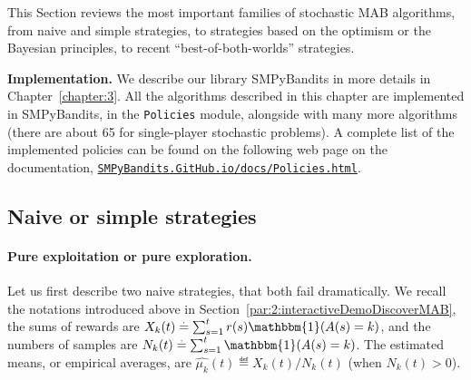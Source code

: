This Section reviews the most important families of stochastic MAB algorithms, from naive and simple strategies, to strategies based on the optimism or the Bayesian principles, to recent ``best-of-both-worlds'' strategies.


\textbf{Implementation.}
%
We describe our library SMPyBandits in more details in Chapter~\ref{chapter:3}.
All the algorithms described in this chapter are implemented in SMPyBandits, in the \texttt{Policies} module, alongside with many more algorithms (there are about 65 for single-player stochastic problems).
A complete list of the implemented policies can be found on the following web page on the documentation,
\href{https://smpybandits.github.io/docs/Policies.html}{\texttt{SMPyBandits.GitHub.io/docs/Policies.html}}.


\subsection{Naive or simple strategies}
\label{sub:2:naiveSimpleStrategies}


\paragraph{Pure exploitation or pure exploration.}

Let us first describe two naive strategies, that both fail dramatically.
We recall the notations introduced above in Section~\ref{par:2:interactiveDemoDiscoverMAB}, the sums of rewards are $X_k(t) \eqdef \sum_{s=1}^t r(s) \mathbbm{1}(A(s) = k)$, and the numbers of samples are $N_k(t) \eqdef \sum_{s=1}^t \mathbbm{1}(A(s) = k)$.
%
The estimated means, or empirical averages, are $\widehat{\mu_k}(t) \eqdef X_k(t) / N_k(t)$ (when $N_k(t)>0$).

